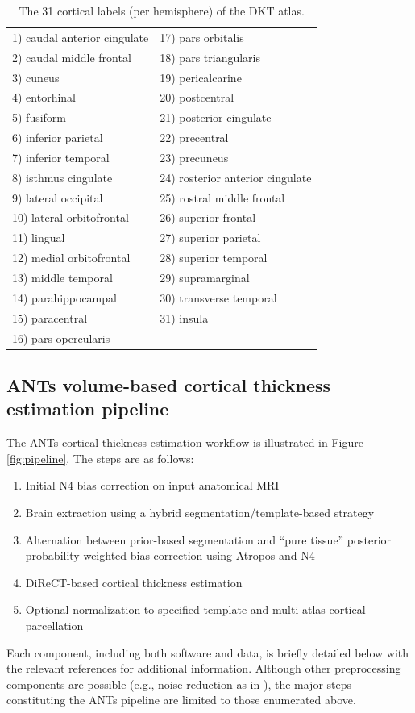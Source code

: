 \begin{table}
\centering
\caption{The 31 cortical labels (per hemisphere) of the DKT atlas.  }
\begin{tabular*}{0.475\textwidth}{@{\extracolsep{\fill}} l l}
\toprule
  1) caudal anterior cingulate & 17) pars orbitalis \\
  2) caudal middle frontal & 18) pars triangularis \\
  3) cuneus &  19) pericalcarine \\
  4) entorhinal & 20) postcentral \\
  5) fusiform &  21) posterior cingulate\\
  6) inferior parietal & 22) precentral \\
  7) inferior temporal & 23) precuneus \\
  8) isthmus cingulate & 24) rosterior anterior cingulate\\
  9) lateral occipital & 25) rostral middle frontal \\
  10) lateral orbitofrontal  & 26) superior frontal \\
  11) lingual & 27) superior parietal \\
  12) medial orbitofrontal & 28) superior temporal \\
  13) middle temporal & 29) supramarginal \\
  14) parahippocampal & 30) transverse temporal \\
  15) paracentral & 31) insula \\
  16) pars opercularis  & {}\\
  \bottomrule
\end{tabular*}
\label{table:dkt_labels}
\end{table}

\subsection{ANTs volume-based cortical thickness estimation pipeline}

The ANTs cortical thickness estimation workflow is illustrated
in Figure \ref{fig:pipeline}.  The steps are as follows:
\begin{enumerate}
  \item Initial N4 bias correction on input anatomical MRI
  \item Brain extraction using a hybrid segmentation/template-based strategy
  \item Alternation between prior-based segmentation and ``pure tissue''
        posterior probability weighted bias correction using Atropos and N4
  \item DiReCT-based cortical thickness estimation
  \item Optional normalization to specified template and multi-atlas
    cortical parcellation
\end{enumerate}
Each component, including both software and data, is briefly detailed 
below with the relevant references for additional information. 
Although other preprocessing components are possible (e.g., noise reduction
as in \cite{smith1996}), the major steps constituting the ANTs pipeline 
are limited to those enumerated above.

